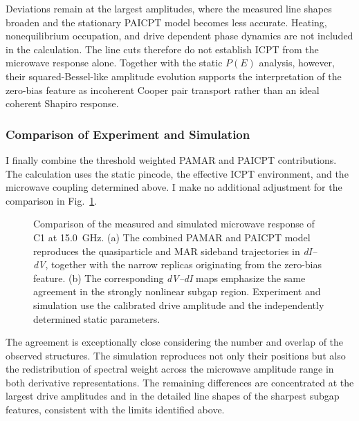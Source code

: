         Deviations remain at the largest amplitudes, where the measured line shapes broaden and the stationary PAICPT model becomes less accurate. Heating, nonequilibrium occupation, and drive dependent phase dynamics are not included in the calculation. The line cuts therefore do not establish ICPT from the microwave response alone. Together with the static $P(E)$ analysis, however, their squared-Bessel-like amplitude evolution supports the interpretation of the zero-bias feature as incoherent Cooper pair transport rather than an ideal coherent Shapiro response.

    \subsubsection*{Comparison of Experiment and Simulation}

        I finally combine the threshold weighted PAMAR and PAICPT contributions. The calculation uses the static pincode, the effective ICPT environment, and the microwave coupling determined above. I make no additional adjustment for the comparison in Fig.~\ref{fig:ac:contact1:comparison}.

        \begin{figure}[t]
            \centering
            \hfill
            \caption{
                Comparison of the measured and simulated microwave response of C1 at \qty{15.0}{\giga\hertz}. (a) The combined PAMAR and PAICPT model reproduces the quasiparticle and MAR sideband trajectories in \textit{dI--dV}, together with the narrow replicas originating from the zero-bias feature. (b) The corresponding \textit{dV--dI} maps emphasize the same agreement in the strongly nonlinear subgap region. Experiment and simulation use the calibrated drive amplitude and the independently determined static parameters.
            }
            \label{fig:ac:contact1:comparison}
        \end{figure}

        The agreement is exceptionally close considering the number and overlap of the observed structures. The simulation reproduces not only their positions but also the redistribution of spectral weight across the microwave amplitude range in both derivative representations. The remaining differences are concentrated at the largest drive amplitudes and in the detailed line shapes of the sharpest subgap features, consistent with the limits identified above.


